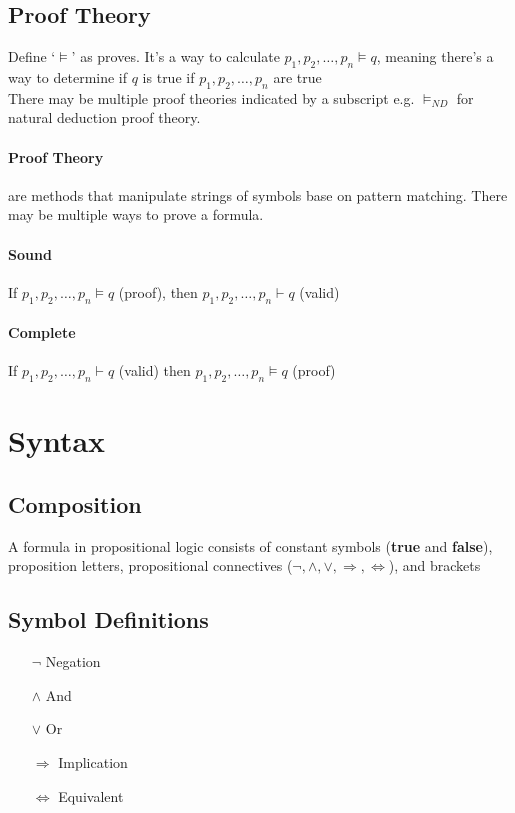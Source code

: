\documentclass[12pt]{report}
\begin{document}
    \subsection{Proof Theory}
      Define `$\models$' as proves. It's a way to calculate $p_1,
      p_2,\ldots,p_n \models q$, meaning there's a way to determine if $q$ is
      true if $p_1, p_2,\ldots,p_n$ are true\\
      There may be multiple proof theories indicated by a subscript e.g.
      $\models_{ND}$ for natural deduction proof theory.

      \paragraph{Proof Theory} are methods that manipulate strings of symbols
      base on pattern matching. There may be multiple ways to prove a formula.

      \paragraph{Sound} If $p_1, p_2,\ldots,p_n \models q$ (proof), then $p_1,
      p_2,\ldots,p_n \vdash q$ (valid)

      \paragraph{Complete} If $p_1, p_2,\ldots,p_n \vdash q$ (valid) then
      $p_1,p_2,\ldots,p_n \models q$ (proof)
  \section{Syntax}
    \subsection{Composition}
      A formula in propositional logic consists of constant symbols
      (\textbf{true} and \textbf{false}), proposition letters, propositional
      connectives ($\lnot, \land, \lor, \Rightarrow, \Leftrightarrow$), and
      brackets

    \subsection{Symbol Definitions}
      \begin{itemize}
        \item[$\lnot$] Negation
        \item[$\land$] And
        \item[$\lor$] Or
        \item[$\Rightarrow$] Implication
        \item[$\Leftrightarrow$] Equivalent
      \end{itemize}
\end{document}
